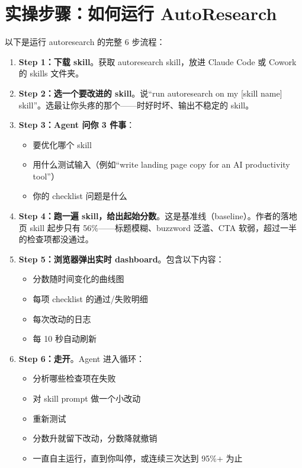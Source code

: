 \documentclass[a4paper]{article}
\begin{document}
\section{实操步骤：如何运行 AutoResearch}

以下是运行 autoresearch 的完整 6 步流程：

\begin{enumerate}
    \item \textbf{Step 1：下载 skill}。获取 autoresearch skill，放进 Claude Code 或 Cowork 的 skills 文件夹。

    \item \textbf{Step 2：选一个要改进的 skill}。说``run autoresearch on my [skill name] skill''。选最让你头疼的那个——时好时坏、输出不稳定的 skill。

    \item \textbf{Step 3：Agent 问你 3 件事}：
    \begin{itemize}
        \item 要优化哪个 skill
        \item 用什么测试输入（例如``write landing page copy for an AI productivity tool''）
        \item 你的 checklist 问题是什么
    \end{itemize}

    \item \textbf{Step 4：跑一遍 skill，给出起始分数}。这是基准线（baseline）。作者的落地页 skill 起步只有 56\%——标题模糊、buzzword 泛滥、CTA 软弱，超过一半的检查项都没通过。

    \item \textbf{Step 5：浏览器弹出实时 dashboard}。包含以下内容：
    \begin{itemize}
        \item 分数随时间变化的曲线图
        \item 每项 checklist 的通过/失败明细
        \item 每次改动的日志
        \item 每 10 秒自动刷新
    \end{itemize}

    \item \textbf{Step 6：走开}。Agent 进入循环：
    \begin{itemize}
        \item 分析哪些检查项在失败
        \item 对 skill prompt 做一个小改动
        \item 重新测试
        \item 分数升就留下改动，分数降就撤销
        \item 一直自主运行，直到你叫停，或连续三次达到 95\%+ 为止
    \end{itemize}
\end{enumerate}
\end{document}
